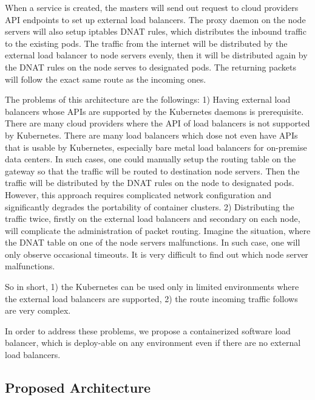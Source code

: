 When a service is created, the masters will send out request to cloud providers API endpoints to set up external load balancers.
The proxy daemon on the node servers will also setup iptables DNAT\cite{MartinA.Brown2017} rules, 
which distributes the inbound traffic to the existing pods.
The traffic from the internet will be distributed by the external load balancer to node servers evenly, 
then it will be distributed again by the DNAT rules on the node serves to designated pods. 
The returning packets will follow the exact same route as the incoming ones.

The problems of this architecture are the followings: 
1) Having external load balancers whose APIs are supported by the Kubernetes daemons is prerequisite. 
There are many cloud providers where the API of load balancers is not supported by Kubernetes. 
There are many load balancers which dose not even have APIs that is usable by Kubernetes, 
especially bare metal load balancers for on-premise data centers.  
In such cases, one could manually setup the routing table on the gateway so that the traffic will be routed to destination node servers.
Then the traffic will be distributed by the DNAT rules on the node to designated pods.
However, this approach requires complicated network configuration and significantly degrades the portability of container clusters.
2) Distributing the traffic twice, firstly on the external load balancers and secondary on each node, 
will complicate the administration of packet routing. 
Imagine the situation, where the DNAT table on one of the node servers malfunctions.
In such case, one will only observe occasional timeouts. It is very difficult to find out which node server malfunctions.   

So in short, 1) the Kubernetes can be used only in limited environments where the external load balancers are supported, 
2) the route incoming traffic follows are very complex.

In order to address these problems, we propose a containerized software load balancer, 
which is deploy-able on any environment even if there are no external load balancers.

\subsection{Proposed Architecture}

